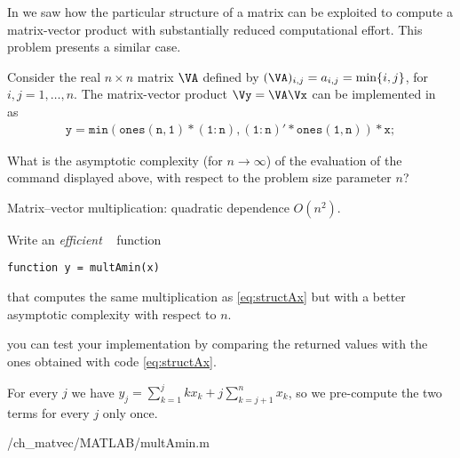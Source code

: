 \renewcommand{\chpt}{ch_matvec}

\begin{problem}
  \label{prb:StructuredMatrixVector}

In  we saw how the particular structure of a matrix can be
exploited to compute a matrix-vector product with substantially reduced
computational effort. This problem presents a similar case.

Consider the real $n\times n$ matrix $\VA$ defined by $(\VA)_{i,j}=a_{i,j}=\min\{i,j\}$, for $i,j=1,\ldots,n$.
The matrix-vector product $\Vy=\VA\Vx$ can be implemented in \Matlab~ as
\begin{gather} \label{eq:structAx}
  \mathtt{ y = min(ones(n,1)*(1:n), (1:n)'*ones(1,n)) * x;}
\end{gather}

\begin{subproblem}[1] \label{subprb:StructuredMatrixVector_1}
What is the asymptotic complexity (for $n\to\infty$) of the evaluation of the \Matlab~ command displayed above, with respect to the problem size parameter $n$?

\begin{solution}
Matrix--vector multiplication:  quadratic dependence $O(n^2)$.
\end{solution}

\end{subproblem}

\begin{subproblem}[3] \label{subprb:StructuredMatrixVector_2}
%
Write an \emph{efficient} \Matlab~ function
%
\begin{center}
\texttt{function y = multAmin(x)}
\end{center}
%
that computes the same multiplication as \eqref{eq:structAx} but with a better asymptotic complexity with respect to {$n$}.

\begin{hint}
you can test your implementation by comparing the returned values with the ones obtained with code \eqref{eq:structAx}.
\end{hint}

\begin{solution}
%
For every $j$ we have $y_j = \sum_{k=1}^j k x_k + j \sum_{k=j+1}^n x_k$, so we pre-compute the two terms for every $j$ only once.
%

{\problems/\chpt/MATLAB/multAmin.m}
\end{solution}


\end{subproblem}
\end{problem}
